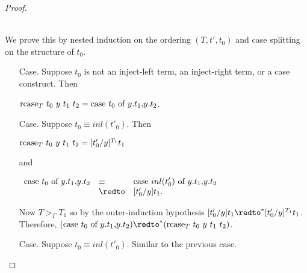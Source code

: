 \begin{proof}
\begin{itemize}
    \ \\
    We prove this by nested induction on the ordering $(T,t',t_0)$ and case splitting on
    the structure of $t_0$.  
    \begin{itemize}
    \item[Case.] Suppose $t_0$ is not an inject-left term, an inject-right term, or a case construct.  Then
      \begin{center}
        $\mbox{rcase}_{T}\ t_0\ y\ t_1\ t_2 = \mbox{case}\ t_0\ \text{of}\ y\text{.}t_1\text{,}y\text{.}t_2$.
      \end{center}
      
    \item[Case.] Suppose $t_0 \equiv inl(t'_0)$.  Then 
      \begin{center}
        $\mbox{rcase}_{T}\ t_0\ y\ t_1\ t_2 = [t'_0/y]^{T_1} t_1$
      \end{center}
      and
      \begin{center}
        \begin{math}
          \begin{array}{lll}
            \ccon{t_0}{y}{t_1}{t_2} & \equiv & \ccon{inl(t'_0)}{y}{t_1}{t_2}\\
            & \redto & [t'_0/y]t_1.
          \end{array}
        \end{math}
      \end{center}
      Now $T >_{\Gamma} T_1$ so by the outer-induction hypothesis 
      $[t'_0/y]t_1 \redto^* [t'_0/y]^{T_1} t_1$.  Therefore, 
      $(\ccon{t_0}{y}{t_1}{t_2}) \redto^* (\rcase{T}{t_0}{y}{t_1}{t_2})$.
      
    \item[Case.] Suppose $t_0 \equiv inl(t'_0)$.  Similar to the previous case.
      

\end{itemize}
\end{itemize}
\end{proof}
